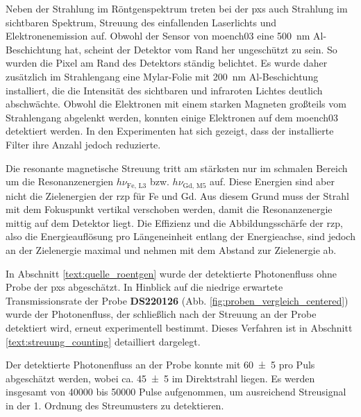 \noindent
Neben der Strahlung im Röntgenspektrum treten bei der \gls{pxs} auch Strahlung im sichtbaren Spektrum, Streuung des einfallenden Laserlichts und Elektronenemission auf. Obwohl der Sensor von \gls{moench03} eine \SI{500}{\nano\meter} Al-Beschichtung hat, scheint der Detektor vom Rand her ungeschützt zu sein. So wurden die Pixel am Rand des Detektors ständig belichtet. Es wurde daher zusätzlich im Strahlengang eine Mylar-Folie mit \SI{200}{\nano\meter} Al-Beschichtung installiert, die die Intensität des sichtbaren und infraroten Lichtes deutlich abschwächte. Obwohl die Elektronen mit einem starken Magneten großteils vom Strahlengang abgelenkt werden, konnten einige Elektronen auf dem \gls{moench03} detektiert werden. In den Experimenten hat sich gezeigt, dass der installierte Filter ihre Anzahl jedoch reduzierte.
%

\noindent
Die resonante magnetische Streuung tritt am stärksten nur im schmalen Bereich um die Resonanzenergien $h\nu_{\text{Fe, L3}}$ bzw. $h\nu_{\text{Gd, M5}}$ auf. Diese Energien sind aber nicht die Zielenergien der \gls{rzp} für Fe und Gd. Aus diesem Grund muss der Strahl mit dem Fokuspunkt vertikal verschoben werden, damit die Resonanzenergie mittig auf dem Detektor liegt. Die Effizienz und die Abbildungsschärfe der \gls{rzp}, also die Energieauflösung pro Längeneinheit entlang der Energieachse, sind jedoch an der Zielenergie maximal und nehmen mit dem Abstand zur Zielenergie ab.

\noindent
In Abschnitt \ref{text:quelle_roentgen} wurde der detektierte Photonenfluss ohne Probe der \gls{pxs} abgeschätzt. In Hinblick auf die niedrige erwartete Transmissionsrate der Probe \textbf{DS220126} (Abb. \ref{fig:proben_vergleich_centered}) wurde der Photonenfluss, der schließlich nach der Streuung an der Probe detektiert wird, erneut experimentell bestimmt. Dieses Verfahren ist in Abschnitt \ref{text:streuung_counting} detailliert dargelegt.

\noindent
Der detektierte Photonenfluss an der Probe konnte mit \SI{60(5)}{\photons} pro Puls abgeschätzt werden, wobei ca. \SI{45(5)}{\photons} im Direktstrahl liegen. Es werden insgesamt von \num{40000} bis \SI{50000}{\captures} Pulse aufgenommen, um ausreichend Streusignal in der 1. Ordnung des Streumusters zu detektieren.


